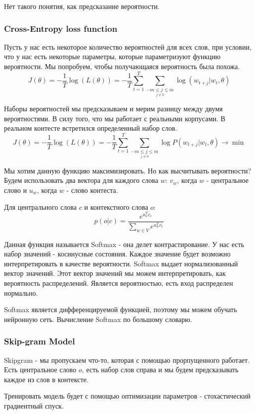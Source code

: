 \documentclass[%
10pt, %
final, %
oneside, %
onecolumn, %
centertags]{article} %
\theoremstyle{plain}
\theoremstyle{definition}
\theoremstyle{remark}
\begin{document}
Нет такого понятия, как предсказание вероятности. 

\subsubsection{Cross-Entropy loss function}

Пусть у нас есть некоторое количество вероятностей для всех слов, при условии, что у нас есть некоторые параметры, которые параметризуют функцию вероятности. Мы попробуем, чтобы получающаяся вероятность была похожа.
$$J(\theta) = - \frac{1}{T} \log (L(\theta)) = - \frac{1}{T}\sum\limits_{t=1}^T \sum\limits_{\underset{j \neq 0}{-m \leq j \leq m}} \log (w_{t+j} | w_t, \theta)$$

Наборы вероятностей мы предсказываем и мерим разницу между двумя вероятностями. В силу того, что мы работает с реальными корпусами. В реальном контесте встретился определенный набор слов.
$$J(\theta) = - \frac{1}{T} \log (L(\theta)) = - \frac{1}{T}\sum\limits_{t=1}^T \sum\limits_{\underset{j \neq 0}{-m \leq j \leq m}} \log P(w_{t+j} | w_t, \theta) \to \min$$

Мы хотим данную функцию максимизировать. Но как высчитывать вероятности? Будем использовать два вектора для каждого слова $w$: $v_{w}$, когда $w$ - центральное слово и $u_{w}$, когда $w$ - слово контеста.

Для центрального слова $c$ и контекстного слова $o$:
$$p(o|c) = \frac{e^{u_o^Tv_c}}{\sum\limits_{w \in V} e^{u_w^T v_c}} $$

Данная функция называется Softmax - она делет контрастирование. У нас есть набор значений - косинусные состояния. Каждое значение будет возможно интерпретировать в качестве вероятности. Softmax выдает нормализованный вектор значений. Этот вектор значений мы можем интерпретировать, как вероятность распределений. Является вероятностью, есть вход распределен нормально.

Softmax является дифференцируемой функцией, поэтому мы можем обучать нейронную сеть. Вычисление Softmax по большому словарю.

\subsubsection{Skip-gram Model}

Skipgram - мы пропускаем что-то, которая с помощью прорпущенного работает. Есть центральное слово $o$, есть набор слов справа и мы будем предсказывать каждое из слов в контексте.

Тренировать модель будет с помощью оптимизации параметров - стохастический градиентный спуск.
\end{document}
